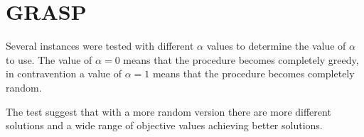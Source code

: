 \section{GRASP}
Several instances were tested
with different $\alpha$ values
to determine the value of $\alpha$ to use.
The value of $\alpha = 0$ means that
the procedure becomes completely greedy,
in contravention
a value of $\alpha = 1$ means that
the procedure becomes completely random.

The test suggest
that
with a more random version
there are more different solutions
and a wide range of objective values
achieving better solutions.
